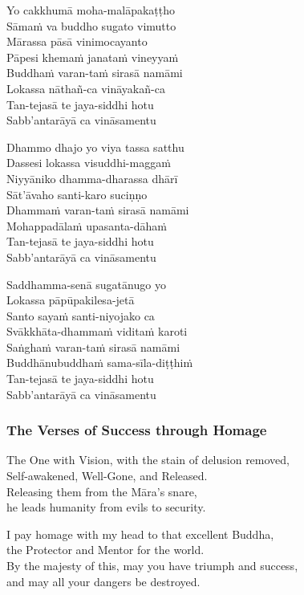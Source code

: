 \begin{paritta}
Yo cakkhumā moha-malāpakaṭṭho\\
Sāmaṁ va buddho sugato vimutto\\
Mārassa pāsā vinimocayanto\\
Pāpesi khemaṁ janataṁ vineyyaṁ\\
Buddhaṁ varan-taṁ sirasā namāmi\\
Lokassa nāthañ-ca vināyakañ-ca\\
Tan-tejasā te jaya-siddhi hotu\\
Sabb'antarāyā ca vināsamentu

Dhammo dhajo yo viya tassa satthu\\
Dassesi lokassa visuddhi-maggaṁ\\
Niyyāniko dhamma-dharassa dhārī\\
Sāt'āvaho santi-karo suciṇṇo\\
Dhammaṁ varan-taṁ sirasā namāmi\\
Mohappadālaṁ upasanta-dāhaṁ\\
Tan-tejasā te jaya-siddhi hotu\\
Sabb'antarāyā ca vināsamentu

Saddhamma-senā sugatānugo yo\\
Lokassa pāpūpakilesa-jetā\\
Santo sayaṁ santi-niyojako ca\\
Svākkhāta-dhammaṁ viditaṁ karoti\\
Saṅghaṁ varan-taṁ sirasā namāmi\\
Buddhānubuddhaṁ sama-sīla-diṭṭhiṁ\\
Tan-tejasā te jaya-siddhi hotu\\
Sabb'antarāyā ca vināsamentu
\end{paritta}

\subsubsection{The Verses of Success through Homage}


The One with Vision, with the stain of delusion removed,\\
Self-awakened, Well-Gone, and Released.\\
Releasing them from the Māra's snare,\\
he leads humanity from evils to security.

\clearpage

I pay homage with my head to that excellent Buddha,\\
the Protector and Mentor for the world.\\
By the majesty of this, may you have triumph and success,\\
and may all your dangers be destroyed.

